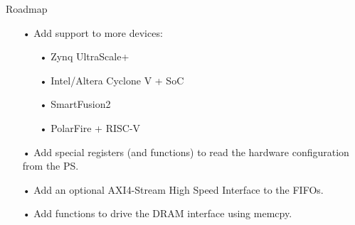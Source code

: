 \documentclass[11pt]{beamer}
\begin{document}
\begin{frame}{Roadmap}
  \begin{itemize}
    \scriptsize
    \item[•] Add support to more devices:
      \begin{itemize}
        \scriptsize
        \item[•] Zynq UltraScale+
        \item[•] Intel/Altera Cyclone V + SoC
        \item[•] SmartFusion2
        \item[•] PolarFire + RISC-V
      \end{itemize}
    \item[•] Add special registers (and functions) to read the hardware configuration from the PS.
    \item[•] Add an optional AXI4-Stream High Speed Interface to the FIFOs.
    \item[•] Add functions to drive the DRAM interface using memcpy.
  \end{itemize}
\end{frame}
\end{document}
